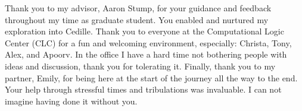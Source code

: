 \begin{acknowledgments}

Thank you to my advisor, Aaron Stump, for your guidance and feedback throughout my time as graduate student.
You enabled and nurtured my exploration into Cedille.
Thank you to everyone at the Computational Logic Center (CLC) for a fun and welcoming environment, especially: Christa, Tony, Alex, and Apoorv.
In the office I have a hard time not bothering people with ideas and discussion, thank you for tolerating it.
Finally, thank you to my partner, Emily, for being here at the start of the journey all the way to the end.
Your help through stressful times and tribulations was invaluable.
I can not imagine having done it without you.

\end{acknowledgments}
